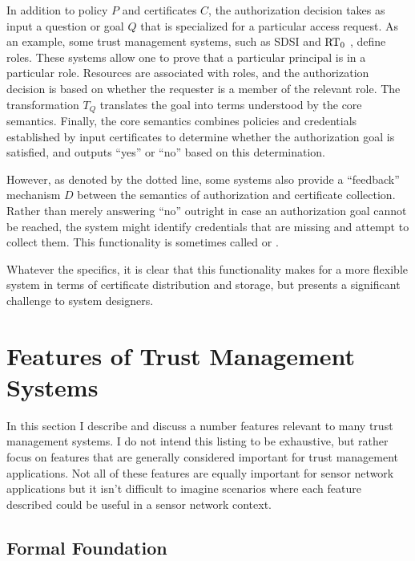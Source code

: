 In addition to policy $P$ and certificates $C$, the authorization decision takes as input a
question or goal $Q$ that is specialized for a particular access request. As an example, some
trust management systems, such as SDSI and $\text{RT}_0$ \cite{Li:DRBTMF,Li:RRBTMF}, define roles.
These systems allow one to prove that a particular principal is in a particular role. Resources
are associated with roles, and the authorization decision is based on whether the requester is a
member of the relevant role. The transformation $T_Q$ translates the goal into terms understood
by the core semantics. Finally, the core semantics combines policies and credentials established
by input certificates to determine whether the authorization goal is satisfied, and outputs
``yes'' or ``no'' based on this determination.

However, as denoted by the dotted line, some systems also provide a ``feedback'' mechanism $D$
between the semantics of authorization and certificate collection. Rather than merely answering
``no'' outright in case an authorization goal cannot be reached, the system might identify
credentials that are missing and attempt to collect them. This functionality is sometimes called
 \cite{Li:DCDTM} or  \cite{Gunter:PDCR}.

Whatever the specifics, it is clear that this functionality makes for a more flexible system in
terms of certificate distribution and storage, but presents a significant challenge to system
designers.

\section{Features of Trust Management Systems}
\label{section-features}

In this section I describe and discuss a number features relevant to many trust management
systems. I do not intend this listing to be exhaustive, but rather focus on features that are
generally considered important for trust management applications. Not all of these features are
equally important for sensor network applications but it isn't difficult to imagine scenarios
where each feature described could be useful in a sensor network context.

\subsection{Formal Foundation}

